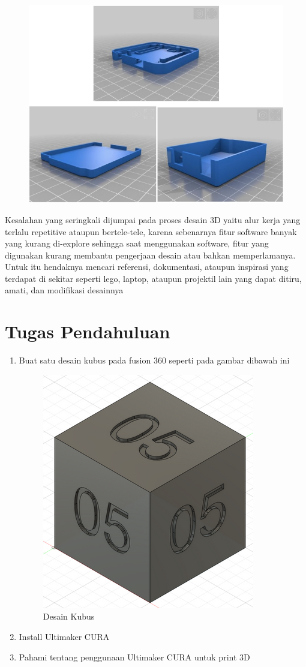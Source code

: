     \begin{figure}[H]
        \centering
        \includegraphics[width=1\linewidth]{P3/img/image2.jpg}
    \end{figure}

Kesalahan yang seringkali dijumpai pada proses desain 3D yaitu alur kerja yang terlalu repetitive ataupun
bertele-tele, karena sebenarnya fitur software banyak yang kurang di-explore sehingga saat
menggunakan software, fitur yang digunakan kurang membantu pengerjaan desain atau bahkan
memperlamanya. Untuk itu hendaknya mencari referensi, dokumentasi, ataupun inspirasi yang terdapat
di sekitar seperti lego, laptop, ataupun projektil lain yang dapat ditiru, amati, dan modifikasi desainnya

\section{Tugas Pendahuluan}
\begin{enumerate}
    \item Buat satu desain kubus pada fusion 360 seperti pada gambar dibawah ini
    \begin{figure}[h]
        \centering
        \includegraphics[width=0.3\linewidth]{P3/img/soal1.png}
        \caption{Desain Kubus}
        \label{fig:soal1}

    \end{figure}
    \item Install Ultimaker CURA  
    \item Pahami tentang penggunaan Ultimaker CURA untuk print 3D
\end{enumerate}

